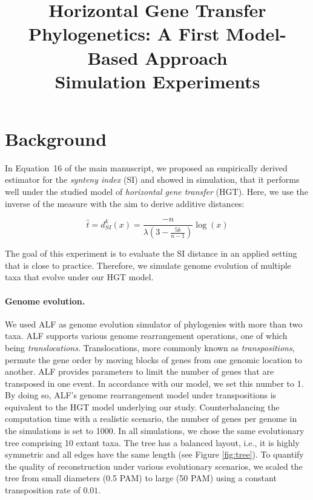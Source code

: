 \documentclass[9pt,english,utf8]{article}
\title{Horizontal Gene Transfer Phylogenetics: A First Model-Based Approach\\
Simulation Experiments}
\begin{document}
\maketitle

\section{Background}

In Equation~16 of the main manuscript, we proposed an empirically derived
estimator for the \emph{synteny index} (SI) and showed in simulation, that it
performs well under the studied model of \emph{horizontal gene transfer} (HGT).
Here, we use the inverse of the measure  with the aim to derive additive
distances:

\begin{equation}
     \hat t = d_{SI}^k(x) = \frac{-n}{\lambda (3-\frac{5k}{n-1})} \log(x)
\end{equation}

The goal of this experiment is to evaluate the SI distance in an applied
setting that is close to practice. Therefore, we simulate genome evolution of
multiple taxa that evolve under our HGT model. 

\paragraph{Genome evolution.} We used ALF\cite{Dalquen:2012dx} as genome
evolution simulator of phylogenies with more than two taxa. ALF supports
various genome rearrangement operations, one of which being
\emph{translocations}. Translocations, more commonly known as
\emph{transpositions}, permute the gene order by moving blocks of genes from
one genomic location to another. ALF provides parameters to limit the number of
genes that are transposed in one event. In accordance with our model, we set
this number to 1. By doing so, ALF's genome rearrangement model under
transpositions is equivalent to the HGT model underlying our study.
Counterbalancing the computation time with a realistic scenario, the number of
genes per genome in the simulations is set to 1000. In all simulations, we
chose the same evolutionary tree comprising 10 extant taxa. The tree has a
balanced layout, i.e., it is highly symmetric and all edges have the same
length (see Figure \ref{fig:tree}). To quantify the quality of reconstruction
under various evolutionary scenarios, we scaled the tree from small diameters
(0.5 PAM) to large (50 PAM) using a constant transposition rate of $0.01$. 
\end{document}
